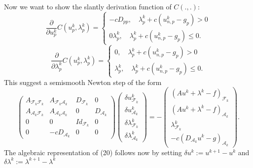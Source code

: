 \documentclass{article}
\begin{document}
Now we want to show the slantly derivation function of $C(.,.)$:
\begin{equation}
 \dfrac{\partial}{\partial u^k_p}C(u^k_p,\lambda^k_p) = \begin{cases}
                                   -cD_{pp},\quad \lambda^k_p + c(u^k_{n,p} - g_p)> 0\\
                                   0\lambda^k_p,\quad \lambda^k_p + c(u^k_{n,p} - g_p)\leq 0.
                                  \end{cases}
\end{equation}
\begin{equation}
 \dfrac{\partial}{\partial\lambda^k_p}C(u^k_p,\lambda^k_p) = \begin{cases}
                                   0,\quad \lambda^k_p + c(u^k_{n,p} - g_p)> 0\\
                                   \lambda^k_p,\quad \lambda^k_p + c(u^k_{n,p} - g_p)\leq 0.
                                  \end{cases}
\end{equation}
This suggest a semismooth Newton step of the form
\begin{equation}
 \begin{pmatrix}
 A_{\mathcal{F}_k\mathcal{F}_k} & A_{\mathcal{F}_k\mathcal{A}_k} & D_{\mathcal{F}_k} & 0\\
 A_{\mathcal{A}_k\mathcal{F}_k} & A_{\mathcal{A}_k\mathcal{A}_k} & 0 & D_{\mathcal{A}_k}\\
 0 & 0 & Id_{\mathcal{F}_k} & 0\\
 0 & -cD_{\mathcal{A}_k} & 0 & 0
\end{pmatrix}
\begin{pmatrix}
 \delta u^k_{\mathcal{F}_k}\\ \delta u^k_{\mathcal{A}_k}\\ \delta \lambda^k_{\mathcal{F}_k}\\ \delta \lambda^k_{\mathcal{A}_k}
\end{pmatrix}
=
-\begin{pmatrix}
 (Au^k + \lambda^k - f)_{\mathcal{F}_k}\\ (Au^k + \lambda^k - f)_{\mathcal{A}_k}\\ \lambda^k_{\mathcal{F}_k}\\ -c(D_{\mathcal{A}_k} u^k - g)_{\mathcal{A}_k}
\end{pmatrix}.
\end{equation}
The algebraic representation of (20) follows now by setting $\delta u^k := u^{k+1} - u^k$ and $\delta \lambda^k := \lambda^{k+1} - \lambda^k$
\end{document}
